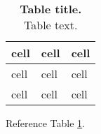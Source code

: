 \begin{table}[hb] \centering
\caption{\textbf{Table title.} Table text.}
\label{table:1}
\begin{tabular}{ p{2in} p{2in} p{2in} } 
	\toprule
	
	\textbf{cell} & \textbf{cell} & \textbf{cell} \\ 
	
	\midrule
	
	cell & cell & cell \\ 
	
	\midrule
	
	cell & cell & cell \\
	
	\bottomrule
\end{tabular}
\end{table}

Reference Table \ref{table:1}.

